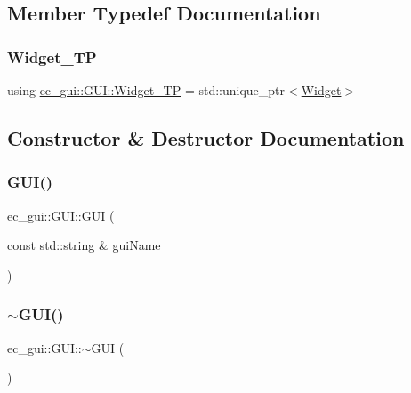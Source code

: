 \subsection{Member Typedef Documentation}
\mbox{\label{classec__gui_1_1_g_u_i_a2b94294ea5a4ad9f8edcb4eb4d97151a}} 
\subsubsection{\texorpdfstring{Widget\+\_\+\+TP}{Widget\_TP}}
{\footnotesize\ttfamily using \mbox{\hyperlink{classec__gui_1_1_g_u_i_a2b94294ea5a4ad9f8edcb4eb4d97151a}{ec\+\_\+gui\+::\+G\+U\+I\+::\+Widget\+\_\+\+TP}} =  std\+::unique\+\_\+ptr$<$\mbox{\hyperlink{classec__gui_1_1_widget}{Widget}}$>$}



\subsection{Constructor \& Destructor Documentation}
\mbox{\label{classec__gui_1_1_g_u_i_a6949ce17b9f0f9bdd1f00e99f2f763ee}} 
\subsubsection{\texorpdfstring{G\+U\+I()}{GUI()}}
{\footnotesize\ttfamily ec\+\_\+gui\+::\+G\+U\+I\+::\+G\+UI (\begin{DoxyParamCaption}\item[{const std\+::string \&}]{gui\+Name }\end{DoxyParamCaption})\hspace{0.3cm}{\ttfamily [explicit]}}

\mbox{\label{classec__gui_1_1_g_u_i_af69316823e49f919c33dc14bd5897af3}} 
\subsubsection{\texorpdfstring{$\sim$\+G\+U\+I()}{~GUI()}}
{\footnotesize\ttfamily ec\+\_\+gui\+::\+G\+U\+I\+::$\sim$\+G\+UI (\begin{DoxyParamCaption}{ }\end{DoxyParamCaption})\hspace{0.3cm}{\ttfamily [virtual]}}



